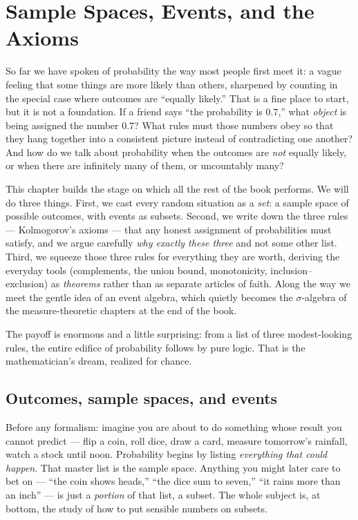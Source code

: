 \chapter{Sample Spaces, Events, and the Axioms}

So far we have spoken of probability the way most people first meet it: a vague
feeling that some things are more likely than others, sharpened by counting in
the special case where outcomes are ``equally likely.'' That is a fine place to
start, but it is not a foundation. If a friend says ``the probability is
$0.7$,'' what \emph{object} is being assigned the number $0.7$? What rules must
those numbers obey so that they hang together into a consistent picture instead
of contradicting one another? And how do we talk about probability when the
outcomes are \emph{not} equally likely, or when there are infinitely many of
them, or uncountably many?

This chapter builds the stage on which all the rest of the book performs. We
will do three things. First, we cast every random situation as a \emph{set}: a
sample space of possible outcomes, with events as subsets. Second, we write down
the three rules --- Kolmogorov's axioms --- that any honest assignment of
probabilities must satisfy, and we argue carefully \emph{why exactly these three}
and not some other list. Third, we squeeze those three rules for everything they
are worth, deriving the everyday tools (complements, the union bound,
monotonicity, inclusion--exclusion) as \emph{theorems} rather than as separate
articles of faith. Along the way we meet the gentle idea of an event algebra,
which quietly becomes the $\sigma$-algebra of the measure-theoretic chapters at
the end of the book.

The payoff is enormous and a little surprising: from a list of three modest-looking
rules, the entire edifice of probability follows by pure logic. That is the
mathematician's dream, realized for chance.

\section{Outcomes, sample spaces, and events}
\label{ch03:sets}

\begin{intuitionbox}
Before any formalism: imagine you are about to do something whose result you
cannot predict --- flip a coin, roll dice, draw a card, measure tomorrow's
rainfall, watch a stock until noon. Probability begins by listing
\emph{everything that could happen}. That master list is the sample space.
Anything you might later care to bet on --- ``the coin shows heads,'' ``the dice
sum to seven,'' ``it rains more than an inch'' --- is just a \emph{portion} of
that list, a subset. The whole subject is, at bottom, the study of how to put
sensible numbers on subsets.
\end{intuitionbox}

